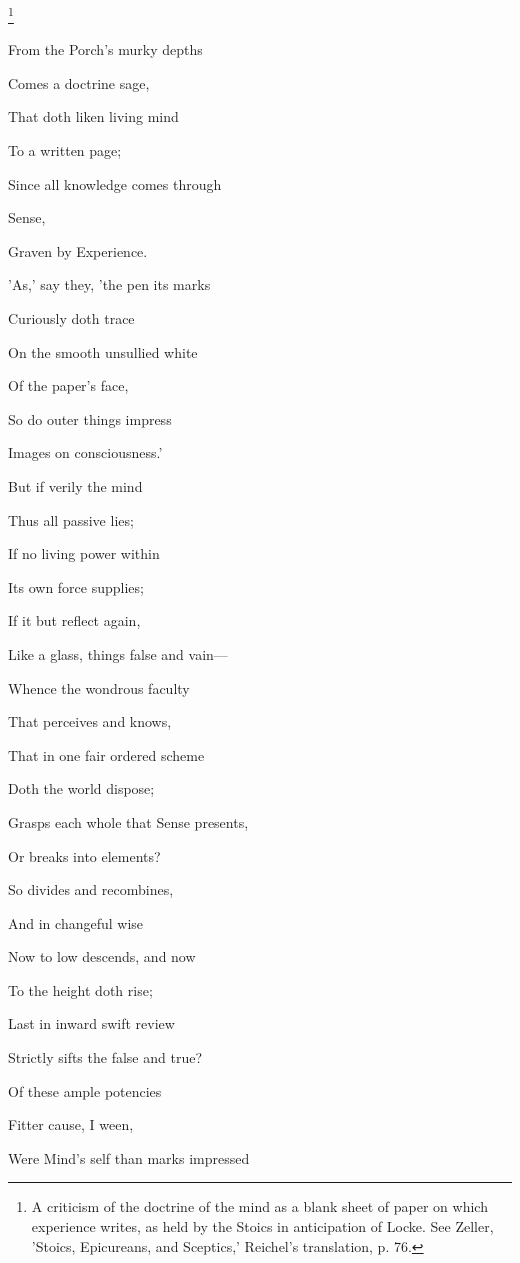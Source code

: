 
\footnote{A criticism of the doctrine of the mind as a blank sheet of
paper on which experience writes, as held by the Stoics in anticipation
of Locke. See Zeller, 'Stoics, Epicureans, and Sceptics,' Reichel's
translation, p. 76.}

From the Porch's murky depths

Comes a doctrine sage,

That doth liken living mind

To a written page;

Since all knowledge comes through

Sense,

Graven by Experience.

'As,' say they, 'the pen its marks

Curiously doth trace

On the smooth unsullied white

Of the paper's face,

So do outer things impress

Images on consciousness.'

But if verily the mind

Thus all passive lies;

If no living power within

Its own force supplies;

If it but reflect again,

Like a glass, things false and vain—

Whence the wondrous faculty

That perceives and knows,

That in one fair ordered scheme

Doth the world dispose;

Grasps each whole that Sense presents,

Or breaks into elements?

So divides and recombines,

And in changeful wise

Now to low descends, and now

To the height doth rise;

Last in inward swift review

Strictly sifts the false and true?

Of these ample potencies

Fitter cause, I ween,

Were Mind's self than marks impressed

